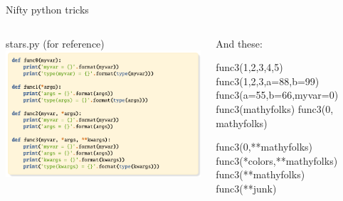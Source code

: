 \documentclass[aspectratio=149, handout] {beamer}
\begin{document}
\begin{frame}[fragile,t]{ Nifty python tricks}

  \begin{columns}
    \begin{column}[t]{.48\textwidth}
      stars.py (for reference)
      \includegraphics[scale=.85, trim= 0 0 7cm 0, clip]{stars.pdf}
    \end{column}
   
    \begin{column}[t]{.48\textwidth}
      And these:
      \begin{pythoncode}
        func3(1,2,3,4,5)
        func3(1,2,3,a=88,b=99)        
        func3(a=55,b=66,myvar=0)
        func3(mathyfolks)
        func3(0, mathyfolks)
      \end{pythoncode}
  
      \pause
      \begin{pythoncode}
        func3(0,**mathyfolks)
        func3(*colors,**mathyfolks)
        func3(**mathyfolks)
        func3(**junk)
      \end{pythoncode}
    \end{column}
  \end{columns}

\end{frame}
\end{document}
